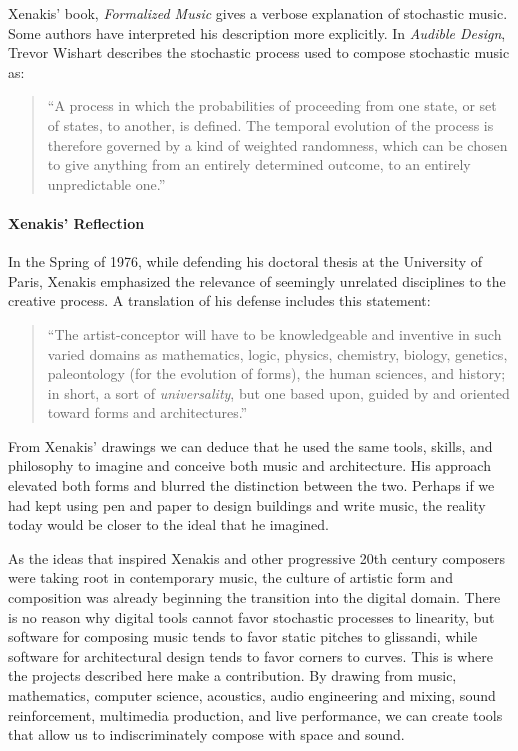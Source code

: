 Xenakis' book, \textit{Formalized Music} gives a verbose explanation
of stochastic music. Some authors have interpreted his description
more explicitly. In \textit{Audible Design}, Trevor Wishart describes
the stochastic process used to compose stochastic music as:
\begin{quotation}
  ``A process in which the probabilities of proceeding from one state,
  or set of states, to another, is defined. The temporal evolution of
  the process is therefore governed by a kind of weighted randomness,
  which can be chosen to give anything from an entirely determined
  outcome, to an entirely unpredictable one.''\cite{Wishart1994}
\end{quotation}

\paragraph{Xenakis' Reflection} In the Spring of 1976, while defending
his doctoral thesis at the University of Paris, Xenakis emphasized the
relevance of seemingly unrelated disciplines to the creative process. A
translation of his defense includes this statement:
\begin{quotation}
  ``The artist-conceptor will have to be knowledgeable and inventive
  in such varied domains as mathematics, logic, physics, chemistry,
  biology, genetics, paleontology (for the evolution of forms), the
  human sciences, and history; in short, a sort of
  \emph{universality}, but one based upon, guided by and oriented
  toward forms and architectures.''\cite{russolo1986art}
\end{quotation}
From Xenakis' drawings we can deduce that he used the same tools,
skills, and philosophy to imagine and conceive both music and
architecture. His approach elevated both forms and blurred the distinction
between the two. Perhaps if we had kept using pen and paper to design
buildings and write music, the reality today would be closer to the
ideal that he imagined. 

As the ideas that inspired Xenakis and other progressive 20th century
composers were taking root in contemporary music, the culture of
artistic form and composition was already beginning the transition
into the digital domain. There is no reason why digital tools cannot
favor stochastic processes to linearity, but software for composing
music tends to favor static pitches to glissandi, while software for
architectural design tends to favor corners to curves. This is where
the projects described here make a contribution.  By drawing from
music, mathematics, computer science, acoustics, audio engineering and
mixing, sound reinforcement, multimedia production, and live
performance, we can create tools that allow us to indiscriminately
compose with space and sound.

